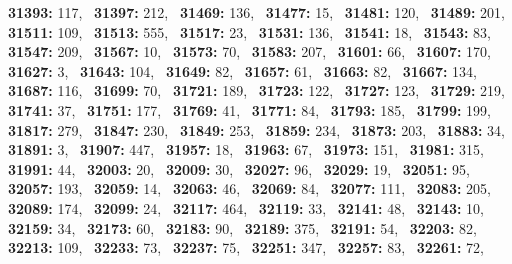 \textbf{31393:} 117,\allowbreak~ 
\textbf{31397:} 212,\allowbreak~ 
\textbf{31469:} 136,\allowbreak~ 
\textbf{31477:} 15,\allowbreak~ 
\textbf{31481:} 120,\allowbreak~ 
\textbf{31489:} 201,\allowbreak~ 
\textbf{31511:} 109,\allowbreak~ 
\textbf{31513:} 555,\allowbreak~ 
\textbf{31517:} 23,\allowbreak~ 
\textbf{31531:} 136,\allowbreak~ 
\textbf{31541:} 18,\allowbreak~ 
\textbf{31543:} 83,\allowbreak~ 
\textbf{31547:} 209,\allowbreak~ 
\textbf{31567:} 10,\allowbreak~ 
\textbf{31573:} 70,\allowbreak~ 
\textbf{31583:} 207,\allowbreak~ 
\textbf{31601:} 66,\allowbreak~ 
\textbf{31607:} 170,\allowbreak~ 
\textbf{31627:} 3,\allowbreak~ 
\textbf{31643:} 104,\allowbreak~ 
\textbf{31649:} 82,\allowbreak~ 
\textbf{31657:} 61,\allowbreak~ 
\textbf{31663:} 82,\allowbreak~ 
\textbf{31667:} 134,\allowbreak~ 
\textbf{31687:} 116,\allowbreak~ 
\textbf{31699:} 70,\allowbreak~ 
\textbf{31721:} 189,\allowbreak~ 
\textbf{31723:} 122,\allowbreak~ 
\textbf{31727:} 123,\allowbreak~ 
\textbf{31729:} 219,\allowbreak~ 
\textbf{31741:} 37,\allowbreak~ 
\textbf{31751:} 177,\allowbreak~ 
\textbf{31769:} 41,\allowbreak~ 
\textbf{31771:} 84,\allowbreak~ 
\textbf{31793:} 185,\allowbreak~ 
\textbf{31799:} 199,\allowbreak~ 
\textbf{31817:} 279,\allowbreak~ 
\textbf{31847:} 230,\allowbreak~ 
\textbf{31849:} 253,\allowbreak~ 
\textbf{31859:} 234,\allowbreak~ 
\textbf{31873:} 203,\allowbreak~ 
\textbf{31883:} 34,\allowbreak~ 
\textbf{31891:} 3,\allowbreak~ 
\textbf{31907:} 447,\allowbreak~ 
\textbf{31957:} 18,\allowbreak~ 
\textbf{31963:} 67,\allowbreak~ 
\textbf{31973:} 151,\allowbreak~ 
\textbf{31981:} 315,\allowbreak~ 
\textbf{31991:} 44,\allowbreak~ 
\textbf{32003:} 20,\allowbreak~ 
\textbf{32009:} 30,\allowbreak~ 
\textbf{32027:} 96,\allowbreak~ 
\textbf{32029:} 19,\allowbreak~ 
\textbf{32051:} 95,\allowbreak~ 
\textbf{32057:} 193,\allowbreak~ 
\textbf{32059:} 14,\allowbreak~ 
\textbf{32063:} 46,\allowbreak~ 
\textbf{32069:} 84,\allowbreak~ 
\textbf{32077:} 111,\allowbreak~ 
\textbf{32083:} 205,\allowbreak~ 
\textbf{32089:} 174,\allowbreak~ 
\textbf{32099:} 24,\allowbreak~ 
\textbf{32117:} 464,\allowbreak~ 
\textbf{32119:} 33,\allowbreak~ 
\textbf{32141:} 48,\allowbreak~ 
\textbf{32143:} 10,\allowbreak~ 
\textbf{32159:} 34,\allowbreak~ 
\textbf{32173:} 60,\allowbreak~ 
\textbf{32183:} 90,\allowbreak~ 
\textbf{32189:} 375,\allowbreak~ 
\textbf{32191:} 54,\allowbreak~ 
\textbf{32203:} 82,\allowbreak~ 
\textbf{32213:} 109,\allowbreak~ 
\textbf{32233:} 73,\allowbreak~ 
\textbf{32237:} 75,\allowbreak~ 
\textbf{32251:} 347,\allowbreak~ 
\textbf{32257:} 83,\allowbreak~ 
\textbf{32261:} 72,\allowbreak~ 

